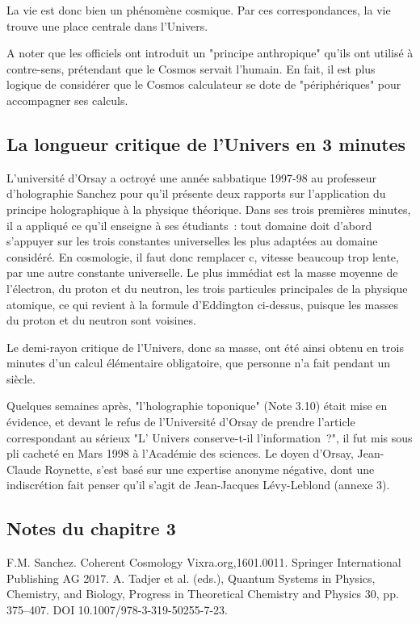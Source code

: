 \documentclass[a4paper,12pt]{article}
\begin{document}
La vie est donc bien un phénomène cosmique. Par ces correspondances, la vie trouve une place centrale dans l'Univers. 

A noter que les officiels ont introduit un "principe anthropique" qu'ils ont utilisé à contre-sens, prétendant que le Cosmos servait l’humain. En fait, il est plus logique de considérer que le Cosmos calculateur se dote de  "périphériques" pour accompagner ses calculs. 


\subsection{La longueur critique de l'Univers en 3 minutes}

     L'université d'Orsay a octroyé une année sabbatique 1997-98 au professeur d'holographie Sanchez pour qu'il présente deux rapports sur l'application du principe holographique à la physique théorique. Dans ses trois premières minutes, il a appliqué ce qu'il enseigne à ses étudiants : tout domaine doit d'abord s'appuyer sur les trois constantes universelles les plus adaptées au domaine considéré. En cosmologie, il faut donc remplacer c, vitesse beaucoup trop lente, par une autre constante universelle. Le plus immédiat est la masse moyenne de l'électron, du proton et du neutron, les trois particules principales de la physique atomique, ce qui revient à la formule d'Eddington ci-dessus, puisque les masses du proton et du neutron sont voisines. 

Le demi-rayon critique de l'Univers, donc sa masse, ont été ainsi obtenu en trois minutes d’un calcul élémentaire obligatoire, que personne n’a fait pendant un siècle.

Quelques semaines après, "l'holographie toponique" (Note 3.10) était mise en évidence, et devant le refus de l'Université d'Orsay de prendre l'article correspondant au sérieux "L' Univers conserve-t-il l'information ?", il fut mis sous pli cacheté en Mars 1998 à l'Académie des sciences. Le doyen d'Orsay, Jean-Claude Roynette, s'est basé sur une expertise anonyme négative, dont une indiscrétion fait penser qu'il s'agit de Jean-Jacques Lévy-Leblond (annexe 3). 


\subsection{Notes du chapitre 3}
 
F.M. Sanchez. Coherent Cosmology Vixra.org,1601.0011. Springer International Publishing AG 2017. A. Tadjer et al. (eds.), Quantum Systems in Physics, Chemistry, and Biology, Progress in Theoretical Chemistry and Physics 30, pp. 375--407. DOI 10.1007/978-3-319-50255-7-23. 
\end{document}
